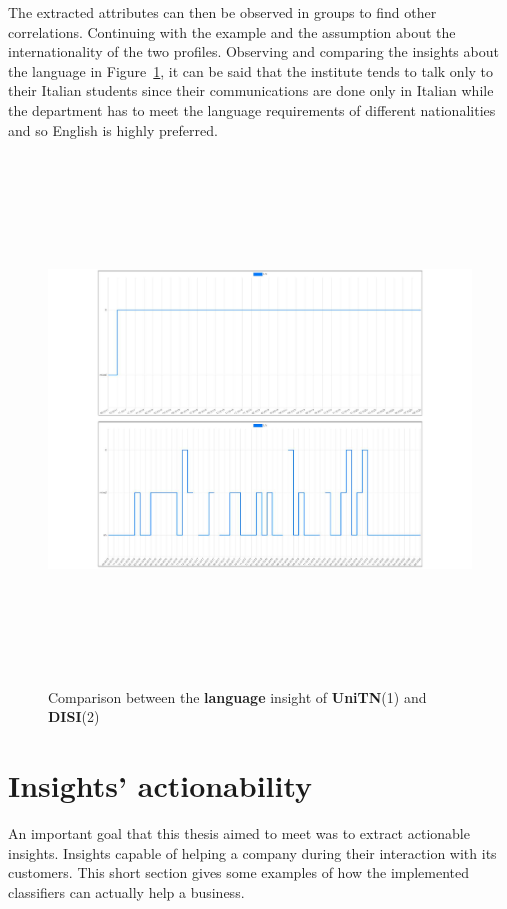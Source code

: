 The extracted attributes can then be observed in groups to find other correlations. Continuing with the example and the assumption about the internationality of the two profiles.
Observing and comparing the insights about the language in Figure~\ref{fig:langComp}, it can be said that the institute tends to talk only to their Italian students since their communications are done only in Italian while the department has to meet the language requirements of different nationalities and so English is highly preferred.

\begin{figure}
    \centering
    \includegraphics[width=%
    1.0\textwidth,height=14cm,keepaspectratio]{img/langComparison.pdf}
    \caption{Comparison between the \textbf{language} insight of \textbf{UniTN}(1) and \textbf{DISI}(2)}
    \label{fig:langComp}
\end{figure}

\section{Insights' actionability}
\label{sec:InsAct}
An important goal that this thesis aimed to meet was to extract actionable insights. Insights capable of helping a company during their interaction with its customers.
This short section gives some examples of how the implemented classifiers can actually help a business.


